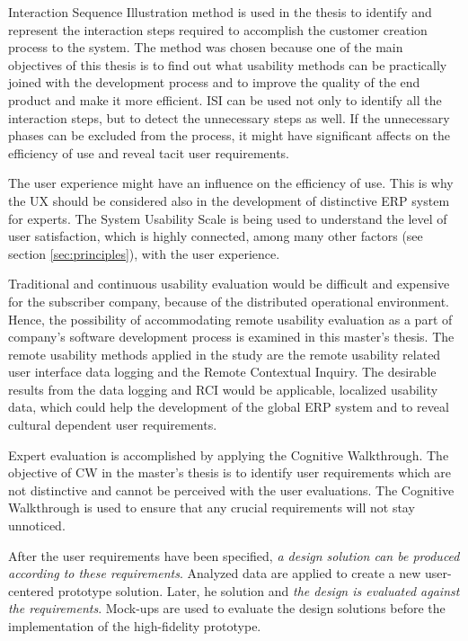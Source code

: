 \documentclass[12pt,a4paper,oneside,pdftex]{report}
\begin{document}
Interaction Sequence Illustration method is used in the thesis to identify and represent the interaction steps required to accomplish the customer creation process to the system. The method was chosen because one of the main objectives of this thesis is to find out what usability methods can be practically joined with the development process and to improve the quality of the end product and make it more efficient. ISI can be used not only to identify all the interaction steps, but to detect the unnecessary steps as well. If the unnecessary phases can be excluded from the process, it might have significant affects on the efficiency of use and reveal tacit user requirements. 

The user experience might have an influence on the efficiency of use. This is why the UX should be considered also in the development of distinctive ERP system for experts. The System Usability Scale is being used to understand the level of user satisfaction, which is highly connected, among many other factors (see section \ref{sec:principles}), with the user experience.

Traditional and continuous usability evaluation would be difficult and expensive for the subscriber company, because of the distributed operational environment. Hence, the possibility of accommodating remote usability evaluation as a part of company's software development process is examined in this master's thesis. The remote usability methods applied in the study are the remote usability related user interface data logging and the Remote Contextual Inquiry. The desirable results from the data logging and RCI would be applicable, localized usability data, which could help the development of the global ERP system and to reveal cultural dependent user requirements. 

Expert evaluation is accomplished by applying the Cognitive Walkthrough. The objective of CW in the master's thesis is to identify user requirements which are not distinctive and cannot be perceived with the user evaluations. The Cognitive Walkthrough is used to ensure that any crucial requirements will not stay unnoticed.

After the user requirements have been specified, \emph{a design solution can be produced according to these requirements}. Analyzed data are applied to create a new user-centered prototype solution. Later, he solution and \emph{the design is evaluated against the requirements}. Mock-ups are used to evaluate the design solutions before the implementation of the high-fidelity prototype.
\end{document}
